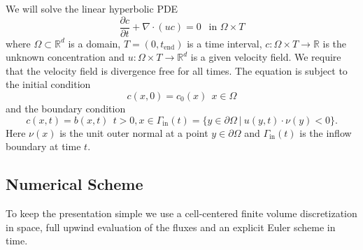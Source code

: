 \documentclass[11pt,a4paper,headinclude,footinclude,DIV16,headings=normal]{scrreprt}
\begin{document}
We will solve the linear hyperbolic PDE
\begin{equation}
\frac{\partial c}{\partial t} + \nabla\cdot (uc) = 0 \ \ \text{ in
  $\Omega\times T$}
\label{Eq:TransportEquation}
\end{equation}
where $\Omega\subset\mathbb{R}^d$ is a domain, $T=(0,t_{\text{end}})$
is a time interval,
$c:\Omega\times T\to\mathbb{R}$ is the unknown concentration and
$u:\Omega\times T\to\mathbb{R}^d$ is a given velocity field. We
require that the velocity field is divergence free for all times.
The equation is subject to the initial condition
\begin{equation}
c(x,0) = c_0(x) \ \ x\in\Omega
\end{equation}
and the boundary condition
\begin{equation}
c(x,t) = b(x,t) \ \ t>0, x\in\Gamma_{\text{in}}(t)=\{y\in\partial\Omega\
|\ u(y,t)\cdot\nu(y)<0\}.
\end{equation}
Here $\nu(x)$ is the unit outer normal at a point $y\in\partial\Omega$
and $\Gamma_{\text{in}}(t)$ is the inflow boundary at time $t$.

\subsection{Numerical Scheme}

To keep the presentation simple we use a cell-centered finite volume
discretization in space, full upwind evaluation of the fluxes and an
explicit Euler scheme in time.
\end{document}
